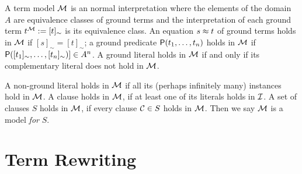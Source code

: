\begin{definition}\label{def:termmodel}
	A {\myem term model} ${\mathcal M}$ is an normal interpretation where the elements of the domain $A$ 
	are equivalence classes of ground terms
	and the interpretation of each ground term $t^{\mathcal M} := [t]_\sim$ is its equivalence class.
	An equation $s\approx t$ of ground terms holds in ${\mathcal M}$ if $[s]_\sim=[t]_\sim$;
	a ground predicate ${\mathsf P}(t_1,\ldots,t_n)$ holds in ${\mathcal M}$ if ${\mathsf P}([t_1]_\sim,\ldots,[t_n]_\sim)] \in A^n$.
	A ground literal holds in ${\mathcal M}$ if and only if its complementary literal does not hold in ${\mathcal M}$.
	
	A non-ground literal holds in ${\mathcal M}$ if all its 
	(perhaps infinitely many)
	instances hold in ${\mathcal M}$.
	A clause holds in ${\mathcal M}$, if at least one of its literals holds in ${\mathcal I}$.
	A set of clauses $S$ holds in ${\mathcal M}$, if every clause ${\mathcal C}\in S$ holds in ${\mathcal M}$.
	Then we say ${\mathcal M}$ is a model {\em for} $S$.
	
\end{definition}

\section{Term Rewriting}

